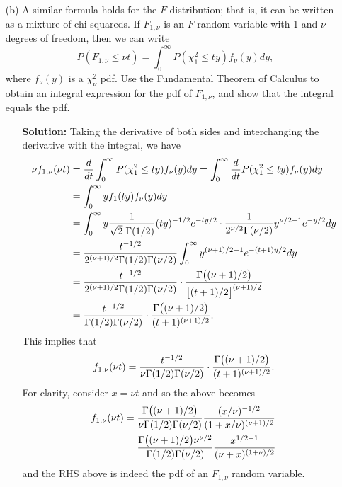 \documentclass[11pt]{article}
\begin{document}
\begin{itemize}
\item[(b)] A similar formula holds for the $F$ distribution; that is, it can be written as a mixture of chi squareds.  If $F_{1,\nu}$ is an $F$ random variable with 1 and $\nu$ degrees of freedom, then we can write
\[
P(F_{1,\nu} \leq \nu t) = \int_0^\infty P(\chi^2_1\leq ty)f_\nu(y)dy,
\]
where $f_\nu(y)$ is a $\chi^2_\nu$ pdf.  Use the Fundamental Theorem of Calculus to obtain an integral expression for the pdf of $F_{1,\nu}$, and show that the integral equals the pdf.
\begin{itemize}
\item[] \textbf{Solution:}  Taking the derivative of both sides and interchanging the derivative with the integral, we have
\begin{align*}
\nu f_{1,\nu}(\nu t) &= \frac{d}{dt} \int_0^\infty P(\chi^2_1\leq ty)f_\nu(y)dy =  \int_0^\infty \frac{d}{dt}
P(\chi^2_1\leq ty)f_\nu(y)dy \\
&= \int_0^\infty yf_1(ty)f_\nu(y)dy \\
&= \int_0^\infty y \frac{1}{\sqrt{2}\hspace{1mm}\Gamma(1/2)} (ty)^{-1/2}e^{-ty/2} \cdot \frac{1}{2^{\nu/2}\Gamma(\nu/2)}y^{\nu/2-1}e^{-y/2}dy \\
&= \frac{t^{-1/2}}{2^{(\nu+1)/2}\Gamma(1/2)\Gamma(\nu/2)} \int_0^\infty y^{(\nu+1)/2 - 1}e^{-(t+1)y/2}dy \\
&= \frac{t^{-1/2}}{2^{(\nu+1)/2}\Gamma(1/2)\Gamma(\nu/2)}\cdot \frac{\Gamma\big{(}(\nu+1)/2\big{)}}{\big{[}(t+1)/2\big{]}^{(\nu+1)/2}} \\
&= \frac{t^{-1/2}}{\Gamma(1/2)\Gamma(\nu/2)}\cdot\frac{\Gamma\big{(}(\nu+1)/2\big{)}}{(t+1)^{(\nu+1)/2}}.
\end{align*}
This implies that 
\[
f_{1,\nu}(\nu t) = \frac{t^{-1/2}}{\nu\Gamma(1/2)\Gamma(\nu/2)}\cdot\frac{\Gamma\big{(}(\nu+1)/2\big{)}}{(t+1)^{(\nu+1)/2}}.
\]
For clarity, consider $x = \nu t$ and so the above becomes
\begin{align*}
f_{1,\nu}(\nu t) &= \frac{\Gamma\big{(}(\nu+1)/2\big{)}}{\nu\Gamma(1/2)\Gamma(\nu/2)}\frac{(x/\nu)^{-1/2}}{(1+x/\nu)^{(\nu+1)/2}} \\
&= \frac{\Gamma\big{(}(\nu+1)/2\big{)}\nu^{\nu/2}}{\Gamma(1/2)\Gamma(\nu/2)}\frac{x^{1/2 - 1}}{(\nu + x)^{(1+\nu)/2}}
\end{align*}
and the RHS above is indeed the pdf of an $F_{1,\nu}$ random variable.
\end{itemize}
\end{itemize}
\end{document}
